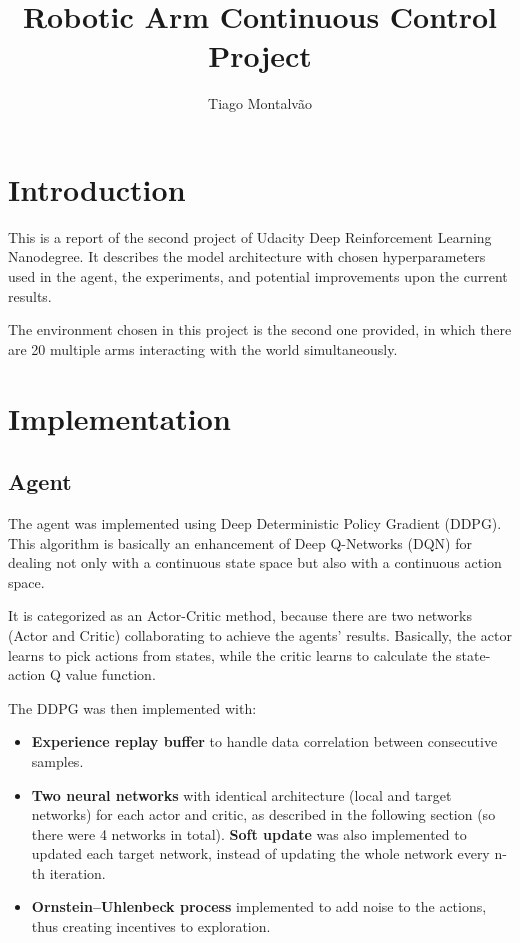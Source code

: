 \documentclass{article}
\title{Robotic Arm Continuous Control Project}
\author{Tiago Montalvão}
\begin{document}
\maketitle
\justify

\section{Introduction}

This is a report of the second project of Udacity Deep Reinforcement Learning Nanodegree. It describes the model architecture with chosen hyperparameters used in the agent, the experiments, and potential improvements upon the current results.

The environment chosen in this project is the second one provided, in which there are 20 multiple arms interacting with the world simultaneously.

\section{Implementation}
\subsection{Agent}

The agent was implemented using Deep Deterministic Policy Gradient (DDPG). This algorithm is basically an enhancement of Deep Q-Networks (DQN) for dealing not only with a continuous state space but also with a continuous action space.

It is categorized as an Actor-Critic method, because there are two networks (Actor and Critic) collaborating to achieve the agents' results. Basically, the actor learns to pick actions from states, while the critic learns to calculate the state-action Q value function.

The DDPG was then implemented with:

\begin{itemize}
    \item \textbf{Experience replay buffer} to handle data correlation between consecutive samples.
    \item \textbf{Two neural networks} with identical architecture (local and target networks) for each actor and critic, as described in the following section (so there were 4 networks in total). \textbf{Soft update} was also implemented to updated each target network, instead of updating the whole network every n-th iteration.
    \item \textbf{Ornstein–Uhlenbeck process} implemented to add noise to the actions, thus creating incentives to exploration. 
\end{itemize}
\end{document}
